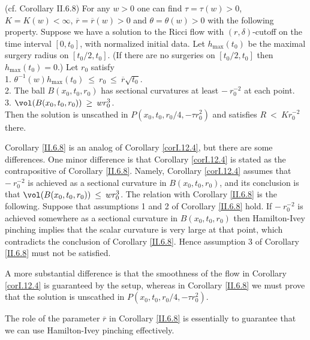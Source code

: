 \begin{corollary}
  \label{cor:kl-double-sided-curvature-bound-thick-part-existence-ricci-flow-surgery}
 \label{II.6.8}
(cf. Corollary II.6.8) For any $w > 0$ one can find
$\tau = \tau(w) > 0$, $K = K(w) < \infty$,
$\overline{r} = \overline{r}(w) > 0$ and $\theta = \theta(w) > 0$ with
the following property. Suppose we have a solution to the Ricci flow
with $(r, \delta)$-cutoff on the time interval $[0, t_0]$, with
normalized initial data.
Let $h_{\max}(t_0)$ be the maximal surgery radius on $[t_0/2, t_0]$.
(If there are no surgeries on $[t_0/2, t_0]$ then $h_{\max}(t_0) = 0$.)
Let $r_0$ satisfy \\
1. $\theta^{-1}(w) h_{\max}(t_0) \: \le \: r_0 \: \le \:
\overline{r} \sqrt{t_0}$.\\
2. The ball $B(x_0, t_0, r_0)$ has sectional curvatures at least
$- \: r_0^{-2}$ at each point.\\
3. $\vol(B(x_0, t_0, r_0)) \: \ge \: w r_0^3$.\\

Then the solution is unscathed in $P(x_0, t_0, r_0/4, - \tau r_0^2)$
and satisfies $R \: < \: Kr_0^{-2}$ there.
\end{corollary}

Corollary \ref{II.6.8} is an analog of Corollary \ref{corI.12.4}, but there
are some differences.  One minor difference is that Corollary \ref{corI.12.4} is
stated as the contrapositive of Corollary \ref{II.6.8}. Namely,
Corollary \ref{corI.12.4} assumes that $- \: r_0^{-2}$ is achieved as a sectional
curvature in $B(x_0, t_0, r_0)$, and its conclusion is that
$\vol(B(x_0, t_0, r_0)) \: \le \: w r_0^3$. The relation
with Corollary \ref{II.6.8} is the following. Suppose that
assumptions 1 and 2 of Corollary \ref{II.6.8} hold. If
$- \: r_0^{-2}$ is achieved somewhere as a sectional
curvature in $B(x_0, t_0, r_0)$ then Hamilton-Ivey pinching implies
that the scalar curvature is very large at that point,
which contradicts the conclusion
of Corollary \ref{II.6.8}. Hence assumption 3 of Corollary \ref{II.6.8}
must not be satisfied.

A more substantial difference is that the smoothness of the flow
in Corollary \ref{corI.12.4}
is guaranteed by the setup, whereas in Corollary \ref{II.6.8} we must
prove that the solution is unscathed in $P(x_0, t_0, r_0/4, - \tau r_0^2)$.

The role of the parameter $\overline{r}$ in Corollary \ref{II.6.8} is
essentially to guarantee that we can use Hamilton-Ivey pinching
effectively.


